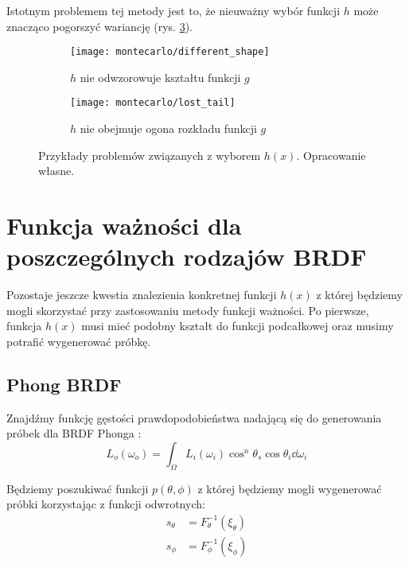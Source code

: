 \documentclass[../main.tex]{subfiles}
\begin{document}
Istotnym problemem tej metody jest to, że nieuważny wybór funkcji $h$ może znacząco pogorszyć wariancję (rys. \ref{fig:ImportanceSamplingProblems}).

\begin{figure}
  \centering

  \begin{subfigure}[t]{0.45\textwidth}
    \texttt{[image: montecarlo/different\_shape]}
    \label{fig:ImportanceSamplingWrongFunction}
    \caption{$h$ nie odwzorowuje kształtu funkcji $g$}
  \end{subfigure}
  \begin{subfigure}[t]{0.45\textwidth}
    \centering
    \texttt{[image: montecarlo/lost\_tail]}
    \label{fig:ImportanceSamplingLostTail}
    \caption{$h$ nie obejmuje ogona rozkładu funkcji $g$}
  \end{subfigure}

  \caption{Przykłady problemów związanych z wyborem $h(x)$. Opracowanie własne.}
  \label{fig:ImportanceSamplingProblems}
\end{figure}

\section{Funkcja ważności dla poszczególnych rodzajów BRDF}

Pozostaje jeszcze kwestia znalezienia konkretnej funkcji $h(x)$ z której będziemy mogli skorzystać przy zastosowaniu metody funkcji ważności. Po pierwsze, funkcja $h(x)$ musi mieć podobny kształt do funkcji podcałkowej oraz musimy potrafić wygenerować próbkę.

\subsection{Phong BRDF}

Znajdźmy funkcję gęstości prawdopodobieństwa nadającą się do generowania próbek dla BRDF Phonga \cite{NotesImportanceSampling,ImportanceSamplingForProduction}:
\[
  L_o(\omega_o) = \int_{\Omega} {
    L_i(\omega_i) \cos^{n}\theta_s \cos\theta_i \dd \omega_i
  }
\]

Będziemy poszukiwać funkcji $p(\theta, \phi)$ z której będziemy mogli wygenerować próbki korzystając z funkcji odwrotnych:
\begin{align*}
  s_\theta &= F_{\theta}^{-1}(\xi_\theta) \\
  s_\phi &= F_{\phi}^{-1}(\xi_\phi)
\end{align*}
\end{document}
